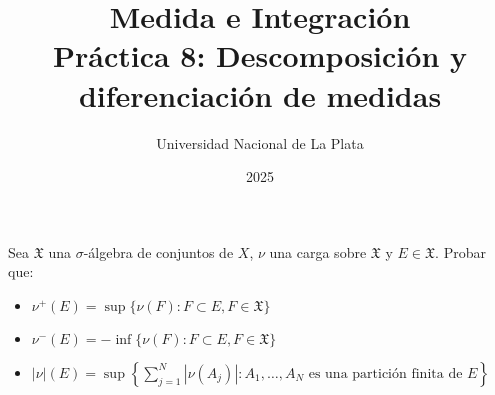 \documentclass[12pt]{article}
\title{Medida e Integración \\ Práctica 8: Descomposición y diferenciación de medidas}
\author{Universidad Nacional de La Plata}
\date{2025}
\newenvironment{statement}[2][Ejercicio]{\begin{trivlist}
\item[\hskip \labelsep {\bfseries #1}\hskip \labelsep {\bfseries #2.}]}{\end{trivlist}}
\begin{document}
\maketitle

\begin{statement}{1}
    Sea \(\mathfrak{X} \) una \(\sigma \)-álgebra de conjuntos de \(X \), \(\nu \) una carga sobre \(\mathfrak{X} \) y \(E \in \mathfrak{X} \). Probar que:
    \begin{itemize}
        \item[(a)] \(\nu^+(E) = \sup\{\nu(F) : F \subset E, F \in \mathfrak{X}\} \)
        \item[(b)] \(\nu^-(E) = -\inf\{\nu(F) : F \subset E, F \in \mathfrak{X}\} \)
        \item[(c)] \(|\nu|(E) = \sup\left\{\sum_{j=1}^{N} |\nu(A_j)| : A_1, \ldots, A_N \text{ es una partición finita de } E \right\} \)
    \end{itemize}
\end{statement}
\end{document}
